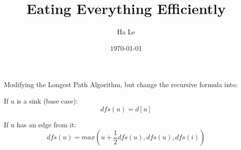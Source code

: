 \documentclass{article}
\begin{document}
\title{Eating Everything Efficiently}
\date{\today}
\author{Ha Le}
\maketitle

Modifying the Longest Path Algorithm, but change the recursive formula into:

If u is a sink (base case):
\[
dfs(u) = d[u]
\]

If u has an edge from it:
\[
dfs(u) = max(u + \frac{1}{2}dfs(u), dfs(u), dfs(i))
\]
\end{document}
